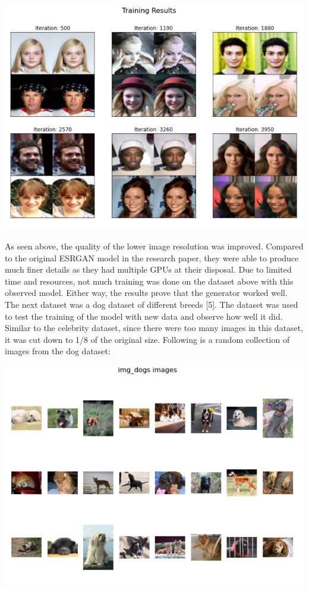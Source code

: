 \documentclass{article}
\begin{document}
\begin{center}
\includegraphics[scale=0.5]{images/img_align_celeba_training_results.jpg}
\end{center}

As seen above, the quality of the lower image resolution was improved. Compared to the original ESRGAN model in the research paper, they were able to produce much finer details as they had multiple GPUs at their disposal. Due to limited time and resources, not much training was done on the dataset above with this observed model. Either way, the results prove that the generator worked well. The next dataset was a dog dataset of different breeds [5]. The dataset was used to test the training of the model with new data and observe how well it did. Similar to the celebrity dataset, since there were too many images in this dataset, it was cut down to 1/8 of the original size. Following is a random collection of images from the dog dataset:

\begin{center}
\includegraphics[scale=0.5]{images/img_dogs_images.jpg}
\end{center}
\end{document}
